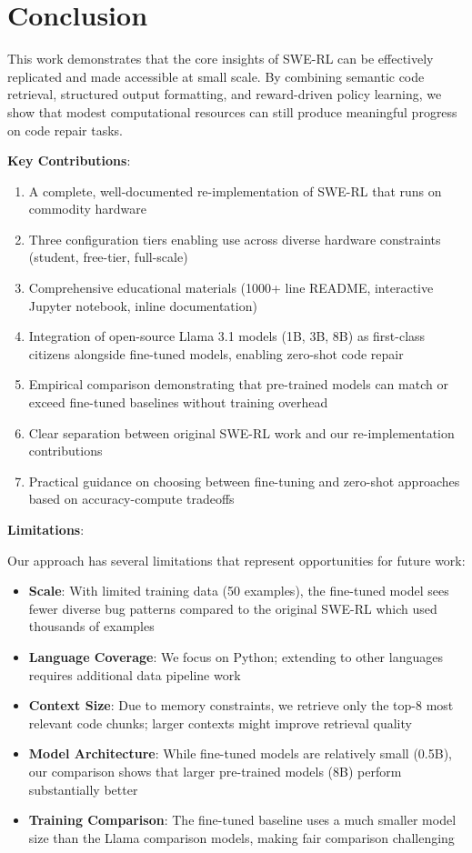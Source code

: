 \documentclass{article} %
\begin{document}
\section{Conclusion}

This work demonstrates that the core insights of SWE-RL can be effectively replicated and made accessible at small scale. By combining semantic code retrieval, structured output formatting, and reward-driven policy learning, we show that modest computational resources can still produce meaningful progress on code repair tasks.

\textbf{Key Contributions}:
\begin{enumerate}
    \item A complete, well-documented re-implementation of SWE-RL that runs on commodity hardware
    \item Three configuration tiers enabling use across diverse hardware constraints (student, free-tier, full-scale)
    \item Comprehensive educational materials (1000+ line README, interactive Jupyter notebook, inline documentation)
    \item Integration of open-source Llama 3.1 models (1B, 3B, 8B) as first-class citizens alongside fine-tuned models, enabling zero-shot code repair
    \item Empirical comparison demonstrating that pre-trained models can match or exceed fine-tuned baselines without training overhead
    \item Clear separation between original SWE-RL work and our re-implementation contributions
    \item Practical guidance on choosing between fine-tuning and zero-shot approaches based on accuracy-compute tradeoffs
\end{enumerate}

\textbf{Limitations}:

Our approach has several limitations that represent opportunities for future work:
\begin{itemize}
    \item \textbf{Scale}: With limited training data (50 examples), the fine-tuned model sees fewer diverse bug patterns compared to the original SWE-RL which used thousands of examples
    \item \textbf{Language Coverage}: We focus on Python; extending to other languages requires additional data pipeline work
    \item \textbf{Context Size}: Due to memory constraints, we retrieve only the top-8 most relevant code chunks; larger contexts might improve retrieval quality
    \item \textbf{Model Architecture}: While fine-tuned models are relatively small (0.5B), our comparison shows that larger pre-trained models (8B) perform substantially better
    \item \textbf{Training Comparison}: The fine-tuned baseline uses a much smaller model size than the Llama comparison models, making fair comparison challenging
\end{itemize}
\end{document}
